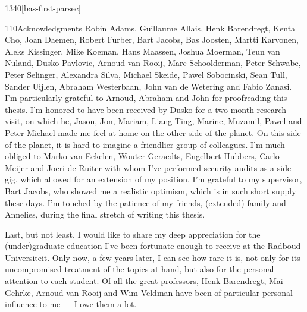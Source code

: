 \begin{parsec}{1340}[bas-first-parsec]
\begin{point}{110}{Acknowledgments}
    Robin Adams,
    Guillaume Allais,
    Henk Barendregt,
    Kenta Cho,
    Joan Daemen,
    Robert Furber,
    Bart Jacobs,
    Bas Joosten,
    Martti Karvonen,
    Aleks Kissinger,
    Mike Koeman,
    Hans Maassen,
    Joshua Moerman,
    Teun van Nuland,
    Dusko Pavlovic,
    Arnoud van Rooij,
    Marc Schoolderman,
    Peter Schwabe,
    Peter Selinger,
    Alexandra Silva,
    Michael Skeide,
    Pawel Sobocinski,
    Sean Tull,
    Sander Uijlen,
    Abraham Westerbaan,
    John van de Wetering and
    Fabio Zanasi.
I'm particularly grateful to Arnoud, Abraham and John
    for proofreading this thesis.
I'm honored to have been received by Dusko
    for a two-month research visit,
    on which he, Jason, Jon, Mariam, Liang-Ting, Marine, Muzamil, Pawel
    and Peter-Michael made me feel at home on the other side of the planet.
On this side of the planet,
    it is hard to imagine a friendlier group of colleagues.
I'm much obliged to Marko van Eekelen,
    Wouter Geraedts,
    Engelbert Hubbers,
    Carlo Meijer and
    Joeri de Ruiter
    with whom I've performed security audits as a side-gig,
    which allowed for an extension of my position.
I'm grateful to my supervisor, Bart Jacobs,
    who showed me a realistic optimism,
    which is in such short supply these days.
I'm touched by the patience of my friends, (extended) family and Annelies,
    during the final stretch of writing this thesis.

Last, but not least, I would like to share my deep appreciation
    for the (under)graduate education
    I've been fortunate enough to receive at the Radboud Universiteit.
Only now, a few years later,
    I can see how rare it is,
    not only for its uncompromised treatment of the topics at hand,
    but also for the personal attention to each student.
Of all the great professors,
Henk Barendregt,
    Mai Gehrke, Arnoud van Rooij and Wim Veldman
    have been of particular personal influence to me --- I owe them a lot.
\end{point}
\end{parsec}


